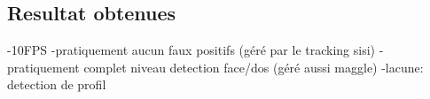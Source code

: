 \documentclass[12pt]{article}
\begin{document}
\subsection{Resultat obtenues}
-10FPS
-pratiquement aucun faux positifs
(géré par le tracking sisi)
-pratiquement complet niveau detection face/dos
(géré aussi maggle)
-lacune: detection de profil

\end{document}
